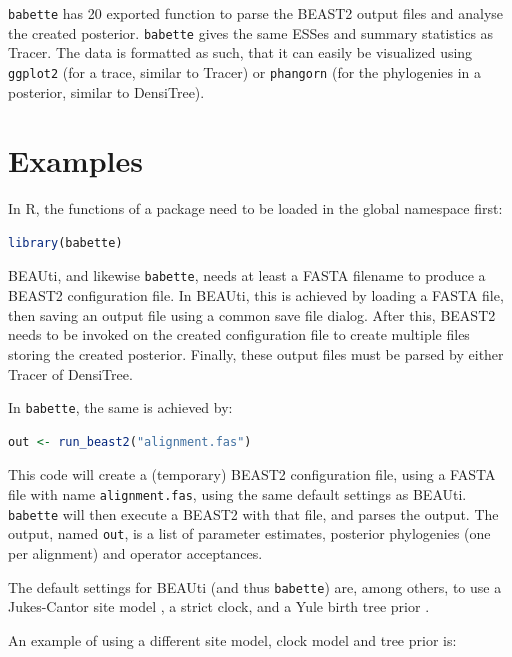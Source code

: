 \documentclass{article}
\begin{document}
\verb;babette; has 20 exported function to parse the BEAST2 output
files and analyse the created posterior. \verb;babette; gives the
same ESSes and summary statistics as Tracer. The data is formatted
as such, that it can easily be visualized using \verb;ggplot2; (for a trace,
similar to Tracer)
or \verb;phangorn; \cite{phangorn} (for the phylogenies in a posterior, similar to DensiTree). 

\section{Examples}

In R, the functions of a package need to be loaded in the global namespace first:

\begin{lstlisting}[language=R, floatplacement=H]
library(babette)
\end{lstlisting}

BEAUti, and likewise \verb;babette;, needs at least a FASTA filename
to produce a BEAST2 configuration file. 
In BEAUti, this is achieved by loading a FASTA file, 
then saving an output file using a common
save file dialog. After this, BEAST2 needs to be invoked
on the created configuration file to create multiple files
storing the created posterior. Finally, these output
files must be parsed by either Tracer of DensiTree.

In \verb;babette;, the same is achieved by:

\begin{lstlisting}[language=R, floatplacement=H]
out <- run_beast2("alignment.fas")
\end{lstlisting}

This code will create a (temporary) BEAST2 configuration file,
using a FASTA file with name \verb;alignment.fas;, 
using the same default settings as BEAUti.
\verb;babette; will then execute a BEAST2 with that file, and
parses the output. The output, named \verb;out;, is a list of
parameter estimates, posterior phylogenies (one per alignment)
and operator acceptances. 

The default settings for BEAUti (and thus \verb;babette;) are, 
among others, to use a Jukes-Cantor site model \cite{cantor1969mammalian}, 
a strict clock, and a Yule birth tree prior \cite{yule}. 

An example of using a different site model, clock model 
and tree prior is:
\end{document}
